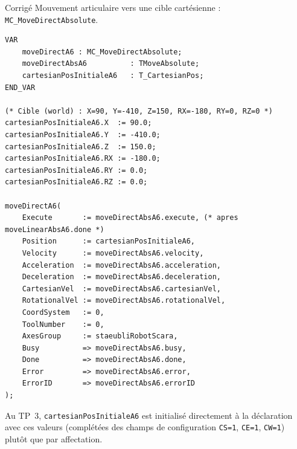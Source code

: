 \begin{UPSTIactivite}

\begin{UPSTIcorrectionP}{Corrigé}
Mouvement articulaire vers une cible cartésienne :
\texttt{MC\_MoveDirectAbsolute}.
\begin{lstlisting}
VAR
    moveDirectA6 : MC_MoveDirectAbsolute;
    moveDirectAbsA6          : TMoveAbsolute;
    cartesianPosInitialeA6   : T_CartesianPos;
END_VAR

(* Cible (world) : X=90, Y=-410, Z=150, RX=-180, RY=0, RZ=0 *)
cartesianPosInitialeA6.X  := 90.0;
cartesianPosInitialeA6.Y  := -410.0;
cartesianPosInitialeA6.Z  := 150.0;
cartesianPosInitialeA6.RX := -180.0;
cartesianPosInitialeA6.RY := 0.0;
cartesianPosInitialeA6.RZ := 0.0;

moveDirectA6(
    Execute       := moveDirectAbsA6.execute, (* apres moveLinearAbsA6.done *)
    Position      := cartesianPosInitialeA6,
    Velocity      := moveDirectAbsA6.velocity,
    Acceleration  := moveDirectAbsA6.acceleration,
    Deceleration  := moveDirectAbsA6.deceleration,
    CartesianVel  := moveDirectAbsA6.cartesianVel,
    RotationalVel := moveDirectAbsA6.rotationalVel,
    CoordSystem   := 0,
    ToolNumber    := 0,
    AxesGroup     := staeubliRobotScara,
    Busy          => moveDirectAbsA6.busy,
    Done          => moveDirectAbsA6.done,
    Error         => moveDirectAbsA6.error,
    ErrorID       => moveDirectAbsA6.errorID
);
\end{lstlisting}
Au TP~3, \texttt{cartesianPosInitialeA6} est initialisé directement à la
déclaration avec ces valeurs (complétées des champs de configuration
\texttt{CS=1}, \texttt{CE=1}, \texttt{CW=1}) plutôt que par affectation.
\end{UPSTIcorrectionP}
\end{UPSTIactivite}

